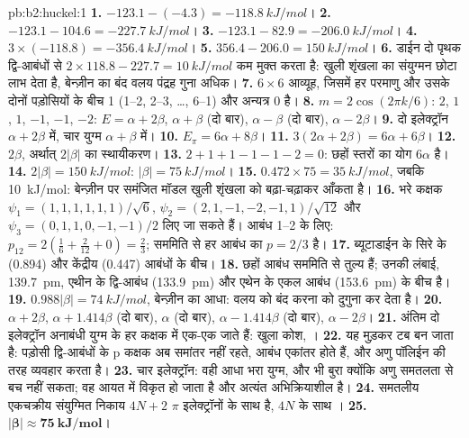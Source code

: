 \begin{solution}{pb:b2:huckel:1}
\textbf{1.} $-123.1 - (-4.3) = \qty{-118.8}{kJ/mol}$।
\textbf{2.} $-123.1 - 104.6 = \qty{-227.7}{kJ/mol}$।
\textbf{3.} $-123.1 - 82.9 = \qty{-206.0}{kJ/mol}$।
\textbf{4.} $3 \times (-118.8) = \qty{-356.4}{kJ/mol}$।
\textbf{5.} $356.4 - 206.0 = \qty{150}{kJ/mol}$।
\textbf{6.} डाईन दो पृथक द्वि-आबंधों से $2 \times 118.8 - 227.7 = \qty{10}{kJ/mol}$ कम
मुक्त करता है: खुली शृंखला का संयुग्मन छोटा लाभ देता है, बेन्ज़ीन का बंद
वलय पंद्रह गुना अधिक।
\textbf{7.} $6 \times 6$ आव्यूह, जिसमें हर परमाणु और उसके दोनों पड़ोसियों के बीच 1 (1--2, 2--3,
\dots, 6--1) और अन्यत्र 0 है।
\textbf{8.} $m = 2\cos(2\pi k/6)$: $2$, $1$, $1$, $-1$, $-1$, $-2$: $E = \alpha + 2\beta$, $\alpha + \beta$ (दो बार),
$\alpha - \beta$ (दो बार), $\alpha - 2\beta$।
\textbf{9.} दो इलेक्ट्रॉन $\alpha + 2\beta$ में, चार युग्म $\alpha + \beta$ में।
\textbf{10.} $E_\pi = 6\alpha + 8\beta$।
\textbf{11.} $3(2\alpha + 2\beta) = 6\alpha + 6\beta$।
\textbf{12.} $2\beta$, अर्थात् $2|\beta|$ का स्थायीकरण।
\textbf{13.} $2 + 1 + 1 - 1 - 1 - 2 = 0$: छहों स्तरों का योग $6\alpha$ है।
\textbf{14.} $2|\beta| = \qty{150}{kJ/mol}$: $|\beta| = \qty{75}{kJ/mol}$।
\textbf{15.} $0.472 \times 75 = \qty{35}{kJ/mol}$, जबकि \qty{10}{kJ/mol}: बेन्ज़ीन पर समंजित
मॉडल खुली शृंखला को बढ़ा-चढ़ाकर आँकता है।
\textbf{16.} भरे कक्षक $\psi_1 = (1, 1, 1, 1, 1, 1)/\sqrt6$,
$\psi_2 = (2, 1, -1, -2, -1, 1)/\sqrt{12}$ और $\psi_3 = (0, 1, 1, 0, -1, -1)/2$ लिए जा सकते हैं। आबंध
1--2 के लिए: $p_{12} = 2(\frac16 + \frac{2}{12} + 0) = \frac23$; सममिति से हर आबंध का $p = 2/3$ है।
\textbf{17.} ब्यूटाडाईन के सिरे के (0.894) और केंद्रीय (0.447) आबंधों के बीच।
\textbf{18.} छहों आबंध सममिति से तुल्य हैं; उनकी लंबाई, \qty{139.7}{pm},
एथीन के द्वि-आबंध (\qty{133.9}{pm}) और एथेन के एकल आबंध
(\qty{153.6}{pm}) के बीच है।
\textbf{19.} $0.988|\beta| = \qty{74}{kJ/mol}$, बेन्ज़ीन का आधा: वलय को बंद करना
 को दुगुना कर देता है।
\textbf{20.} $\alpha + 2\beta$, $\alpha + 1.414\beta$ (दो बार), $\alpha$ (दो बार), $\alpha - 1.414\beta$ (दो बार),
$\alpha - 2\beta$।
\textbf{21.} अंतिम दो इलेक्ट्रॉन अनाबंधी युग्म के हर कक्षक में एक-एक जाते हैं: खुला
कोश, ।
\textbf{22.} यह मुड़कर टब बन जाता है: पड़ोसी द्वि-आबंधों के p कक्षक अब
समांतर नहीं रहते, आबंध एकांतर होते हैं, और अणु पॉलिईन की तरह व्यवहार करता है।
\textbf{23.} चार इलेक्ट्रॉन: वही आधा भरा युग्म, और भी बुरा क्योंकि अणु समतलता से
बच नहीं सकता; वह आयत में विकृत हो जाता है और अत्यंत अभिक्रियाशील है।
\textbf{24.} समतलीय एकचक्रीय संयुग्मित निकाय $4N + 2$ $\pi$ इलेक्ट्रॉनों के साथ  है,
$4N$ के साथ ।
\textbf{25.} $\boldsymbol{|\beta| \approx \qty{75}{kJ/mol}}$।
\end{solution}
